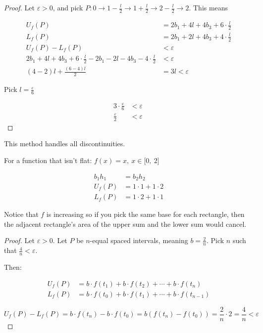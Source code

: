\documentclass[12pt]{article}
\theoremstyle{plain}
\theoremstyle{remark}
\theoremstyle{definition}
\begin{document}
\begin{proof} Let \(\varepsilon > 0\), and pick
\(P:0 \rightarrow 1 - \frac{l}{2} \rightarrow 1 + \frac{l}{2} \rightarrow 2 - \frac{l}{2} \rightarrow 2\).
This means

\begin{align*}
U_{f}(P) &= 2b_{1} + 4l + 4b_{3} + 6 \cdot \frac{l}{2} \\
L_{f}(P) &= 2b_{1} + 2l + 4b_{3} + 4 \cdot \frac{l}{2} \\
U_{f}(P) - L_{f}(P) &< \varepsilon \\
2b_{1} + 4l + 4b_{3} + 6 \cdot \frac{l}{2} - 2b_{1} - 2l - 4b_{3} - 4 \cdot \frac{l}{2} &< \varepsilon \\
(4 - 2)l + \frac{(6 - 4)l}{2} &= 3l < \varepsilon
\end{align*}


Pick \(l = \frac{\varepsilon}{6}\)

\begin{align*}
3 \cdot \frac{\varepsilon}{6} &< \varepsilon \\
\frac{\varepsilon}{2} &< \varepsilon\
\end{align*}

\end{proof}

This method handles all discontinuities.

For a function that isn't flat:
\(f(x) = x,\ x \in \lbrack 0,\ 2\rbrack\)

\begin{align*}
b_{1}h_{1} &= b_{2}h_{2} \\
U_{f}(P) &= 1 \cdot 1 + 1 \cdot 2 \\
L_{f}(P) &= 1 \cdot 2 + 1 \cdot 1
\end{align*}


Notice that \(f\) is increasing so if you pick the same base for each
rectangle, then the adjacent rectangle's area of the upper sum and the
lower sum would cancel.


\begin{proof} Let \(\varepsilon > 0\). Let \(P\) be \(n\)-equal spaced
intervals, meaning \(b = \frac{2}{n}\). Pick \(n\) such that
\(\frac{4}{n} < \varepsilon\).

Then:

\begin{align*}
U_{f}(P) &= b \cdot f\left( t_{1} \right) + b \cdot f\left( t_{2} \right) + \cdots + b \cdot f\left( t_{n} \right) \\
L_{f}(P) &= b \cdot f\left( t_{0} \right) + b \cdot f\left( t_{1} \right) + \cdots + b \cdot f\left( t_{n - 1} \right)
\end{align*}


\[U_{f}(P) - L_{f}(P) = b \cdot f\left( t_{n} \right) - b \cdot f\left( t_{0} \right) = b\left( f\left( t_{n} \right) - f\left( t_{0} \right) \right) = \frac{2}{n} \cdot 2 = \frac{4}{n} < \varepsilon\ \]
\end{proof}
\end{document}
